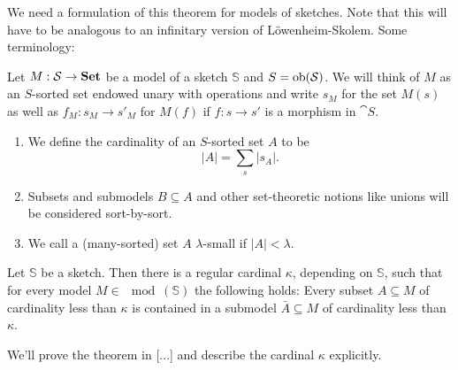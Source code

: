 We need a formulation of this theorem for models of sketches. Note that this will have to be analogous to an infinitary version of Löwenheim-Skolem. Some terminology:
\begin{Definition}
Let $M : \mathcal{S} \to \mathbf{Set}$ be a model of a sketch $\mathbb S$ and $S = \textrm{ob}(\mathcal{S})$. We will think of $M$ as an $S$-sorted set endowed unary with operations and write $s_M$ for the set $M(s)$ as well as $f_M : s_M \to s'_M$ for $M(f)$ if $f : s \to s'$ is a morphism in $\cat S$.
\begin{enumerate}
\item We define the cardinality of an $S$-sorted set $A$ to be \[ |A| = \sum_s |s_A|. \]
\item Subsets and submodels $B \subseteq A$ and other set-theoretic notions like unions will be considered sort-by-sort.
\item We call a (many-sorted) set $A$ $\lambda$-small if $|A|<\lambda$.
\end{enumerate}
\end{Definition}

\begin{Theorem}
Let $\mathbb S$ be a sketch. Then there is a regular cardinal $\kappa$, depending on $\mathbb S$, such that for every model $M \in \mod(\mathbb S)$ the following holds: Every subset $A \subseteq M$ of cardinality less than $\kappa$ is contained in a submodel $\bar A \subseteq M$ of cardinality less than $\kappa$.
\end{Theorem}
We'll prove the theorem in [...] and describe the cardinal $\kappa$ explicitly. \\

